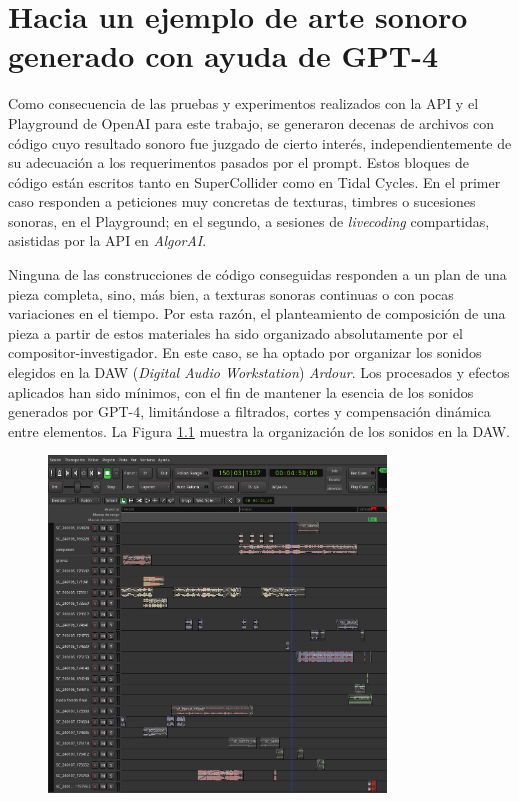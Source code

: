 \chapter{Hacia un ejemplo de arte sonoro generado con ayuda de GPT-4}



Como consecuencia de las pruebas y experimentos realizados con la API y el Playground de OpenAI para este trabajo, se generaron decenas de archivos con código cuyo resultado sonoro fue juzgado de cierto interés, independientemente de su adecuación a los requerimentos pasados por el prompt. Estos bloques de código están escritos tanto en SuperCollider como en Tidal Cycles. En el primer caso responden a peticiones muy concretas de texturas, timbres o sucesiones sonoras, en el Playground; en el segundo, a sesiones de \textit{livecoding} compartidas, asistidas por la API en \textit{AlgorAI}.

Ninguna de las construcciones de código conseguidas responden a un plan de una pieza completa, sino, más bien, a texturas sonoras continuas o con pocas variaciones en el tiempo. Por esta razón, el planteamiento de composición de una pieza a partir de estos materiales ha sido organizado absolutamente por el compositor-investigador. En este caso, se ha optado por organizar los sonidos elegidos en la DAW (\textit{Digital Audio Workstation}) \textit{Ardour}. Los procesados y efectos aplicados han sido mínimos, con el fin de mantener la esencia de los sonidos generados por GPT-4, limitándose a filtrados, cortes y compensación dinámica entre elementos. La Figura \ref{fig:ardour} muestra la organización de los sonidos en la DAW.

\begin{figure}
    \centering
    \includegraphics[width=0.8\textwidth]{./figuras/ardour.png}
    \source{\propio}
    \label{fig:ardour}
\end{figure}


